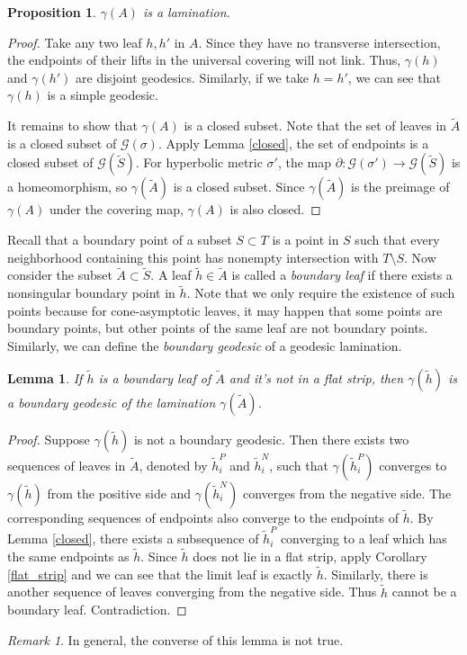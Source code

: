 \documentclass[reqno]{amsart}
\theoremstyle{plain}
\newtheorem{lemma}[thm]{Lemma}
\newtheorem{prop}[thm]{Proposition}
\theoremstyle{definition}
\theoremstyle{remark}
\newtheorem*{rmk}{Remark}
\theoremstyle{definition}
\newcommand{\?}{\textcolor{red}{?}}
\newcommand{\Gsigma}{\mathcal{G}(\sigma) }
\newcommand{\Gs}{\mathcal{G}(\tilde{S}) }
\begin{document}
\begin{prop}
$\gamma(A)$ is a lamination.
\end{prop}
\begin{proof}
Take any two leaf $h,h'$ in $A$. Since they have no transverse intersection, the endpoints of their lifts in the universal covering will not link. Thus, $\gamma(h)$ and $\gamma(h')$ are disjoint geodesics. Similarly, if we take $h=h'$, we can see that $\gamma(h)$ is a simple geodesic.

It remains to show that $\gamma(A)$ is a closed subset. Note that the set of leaves in $\tilde{A}$ is a closed subset of $\Gsigma$. Apply Lemma \ref{closed}, the set of endpoints is a closed subset of $\Gs$. For hyperbolic metric $\sigma'$, the map $\partial:\mathcal{G}(\sigma')\rightarrow \Gs$ is a homeomorphism, so $\gamma(\tilde{A})$ is a closed subset. Since $\gamma(\tilde{A})$ is the preimage of $\gamma(A)$ under the covering map, $\gamma(A)$ is also closed.
\end{proof}

Recall that a boundary point of a subset $S\subset T$ is a point in $S$ such that every neighborhood containing this point has nonempty intersection with $T\setminus S$. Now consider the subset $\tilde{A}\subset\tilde{S}$. A leaf $\tilde{h}\in \tilde{A}$ is called a \textit{boundary leaf} if there exists a nonsingular boundary point in $\tilde{h}$. Note that we only require the existence of such points because for cone-asymptotic leaves, it may happen that some points are boundary points, but other points of the same leaf are not boundary points. Similarly, we can define the \textit{boundary geodesic} of a geodesic lamination.

\begin{lemma}\label{boundary leaf}
If $\tilde{h}$ is a boundary leaf of $\tilde{A}$ and it's not in a flat strip, then $\gamma(\tilde{h})$ is a boundary geodesic of the lamination $\gamma(\tilde{A})$.
\end{lemma}
\begin{proof}
Suppose $\gamma(\tilde{h})$ is not a boundary geodesic. Then there exists two sequences of leaves in $\tilde{A}$, denoted by $\tilde{h}_i^P$ and $\tilde{h}_i^N$, such that $\gamma(\tilde{h}_i^P)$ converges to $\gamma(\tilde{h})$ from the positive side and $\gamma(\tilde{h}_i^N)$ converges from the negative side. The corresponding sequences of endpoints also converge to the endpoints of $\tilde{h}$. By Lemma \ref{closed}, there exists a subsequence of $\tilde{h}_i^P$ converging to a leaf which has the same endpoints as $\tilde{h}$. Since $\tilde{h}$ does not lie in a flat strip, apply Corollary \ref{flat_strip} and we can see that the limit leaf is exactly $\tilde{h}$. Similarly, there is another sequence of leaves converging from the negative side. Thus $\tilde{h}$ cannot be a boundary leaf. Contradiction.
\end{proof}
\begin{rmk}
In general, the converse of this lemma is not true.
\end{rmk}
\end{document}
